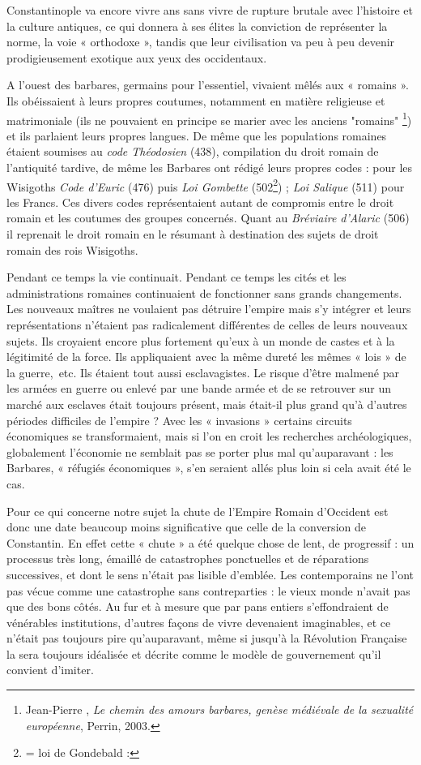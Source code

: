  Constantinople va encore vivre  ans sans vivre de rupture brutale avec l'histoire et la culture antiques, ce qui donnera à ses élites la conviction de représenter la norme, la voie « orthodoxe », tandis que leur civilisation va peu à peu devenir prodigieusement exotique aux yeux des occidentaux.

A l'ouest des barbares, germains pour l'essentiel, vivaient mêlés aux « romains ».  Ils obéissaient à leurs propres coutumes, notamment en matière religieuse et matrimoniale (ils ne pouvaient en principe se marier avec les anciens "romains"
\footnote{Jean-Pierre , \emph{Le chemin des amours barbares, genèse médiévale de la sexualité européenne}, Perrin, 2003.}) et ils parlaient leurs propres langues. De même que les populations romaines étaient soumises au \emph{code Théodosien} (438), compilation du droit romain de l'antiquité tardive, de même les Barbares ont rédigé leurs propres codes : pour les Wisigoths \emph{Code d'Euric} (476) puis \emph{Loi Gombette} (502\footnote{= loi de Gondebald : }) ; \emph{Loi Salique} (511) pour les Francs. Ces divers codes représentaient autant de compromis entre le droit romain et les coutumes des groupes concernés. Quant au \emph{Bréviaire d'Alaric} (506) il reprenait le droit romain en le résumant à destination des sujets de droit romain des rois Wisigoths.

 Pendant ce temps la vie continuait. Pendant ce temps les cités et les administrations romaines continuaient de fonctionner sans grands changements. Les nouveaux maîtres ne voulaient pas détruire l'empire mais s'y intégrer et leurs représentations n'étaient pas radicalement différentes de celles de leurs nouveaux sujets. Ils croyaient encore plus fortement qu'eux à un monde de castes et à la légitimité de la force. Ils appliquaient avec la même dureté les mêmes « lois » de la guerre,~etc. Ils étaient tout aussi esclavagistes. Le risque d'être malmené par les armées en guerre ou enlevé par une bande armée et de se retrouver sur un marché aux esclaves était toujours présent, mais était-il plus grand qu'à d'autres périodes difficiles de l'empire ? Avec les « invasions » certains circuits économiques se transformaient, mais si l'on en croit les recherches archéologiques, globalement l'économie ne semblait pas se porter plus mal qu'auparavant : les Barbares, « réfugiés économiques », s'en seraient allés plus loin si cela avait été le cas.

 Pour ce qui concerne notre sujet la chute de l'Empire Romain d'Occident est donc une date beaucoup moins significative que celle de la conversion de Constantin. En effet cette « chute » a été quelque chose de lent, de progressif : un processus très long, émaillé de catastrophes ponctuelles et de réparations successives, et dont le sens n'était pas lisible d'emblée. Les contemporains ne l'ont pas vécue comme une catastrophe sans contreparties : le vieux monde n'avait pas que des bons côtés. Au fur et à mesure que par pans entiers s'effondraient de vénérables institutions, d'autres façons de vivre devenaient imaginables, et ce n'était pas toujours pire qu'auparavant, même si jusqu'à la Révolution Française la  sera toujours idéalisée et décrite comme le modèle de gouvernement qu'il convient d'imiter. 

